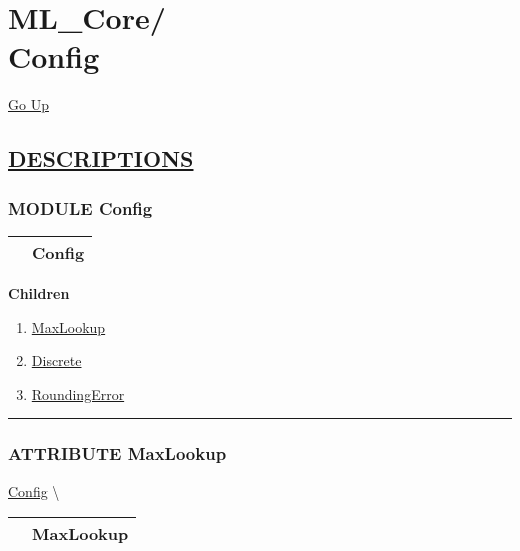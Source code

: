 \chapter*{\color{headfile}
{\large ML\_Core\slash\hspace{0pt}}
 \\
Config
}
\hypertarget{ecldoc:toc:ML_Core.Config}{}
\hyperlink{ecldoc:toc:root/ML_Core}{Go Up}


\section*{\underline{\textsf{DESCRIPTIONS}}}
\subsection*{\textsf{\colorbox{headtoc}{\color{white} MODULE}
Config}}

\hypertarget{ecldoc:ML_Core.Config}{}

{\renewcommand{\arraystretch}{1.5}
\begin{tabularx}{\textwidth}{|>{\raggedright\arraybackslash}l|X|}
\hline
\hspace{0pt}\mytexttt{\color{red} } & \textbf{Config} \\
\hline
\end{tabularx}
}

\par


\textbf{Children}
\begin{enumerate}
\item \hyperlink{ecldoc:ml_core.config.maxlookup}{MaxLookup}
\item \hyperlink{ecldoc:ml_core.config.discrete}{Discrete}
\item \hyperlink{ecldoc:ml_core.config.roundingerror}{RoundingError}
\end{enumerate}

\rule{\linewidth}{0.5pt}

\subsection*{\textsf{\colorbox{headtoc}{\color{white} ATTRIBUTE}
MaxLookup}}

\hypertarget{ecldoc:ml_core.config.maxlookup}{}
\hspace{0pt} \hyperlink{ecldoc:ML_Core.Config}{Config} \textbackslash 

{\renewcommand{\arraystretch}{1.5}
\begin{tabularx}{\textwidth}{|>{\raggedright\arraybackslash}l|X|}
\hline
\hspace{0pt}\mytexttt{\color{red} } & \textbf{MaxLookup} \\
\hline
\end{tabularx}
}

